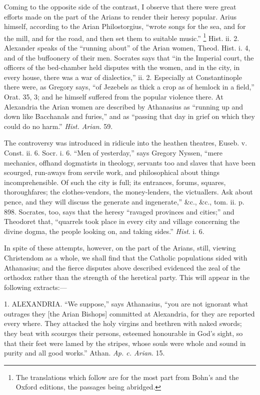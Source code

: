 Coming to the opposite side of the contrast, I observe that there
were great efforts made on the part of the Arians to render their
heresy popular. Arius himself, according to the Arian Philostorgius,
``wrote songs for the sea, and for the mill, and for the road, and
then set them to suitable music.'' \footnote{The translations which follow are for the
most part from Bohn's and the Oxford editions, the passages being
abridged.} Hist. ii. 2. Alexander speaks of the ``running about''
of the Arian women, Theod. Hist. i. 4, and of the buffoonery of their
men. Socrates says that ``in the Imperial court, the officers of
the bed-chamber held disputes with the women, and in the city,
in every house, there was a war of dialectics,'' ii. 2. Especially
at Constantinople there were, as Gregory says, ``of Jezebels as
thick a crop as of hemlock in a field,'' Orat. 35, 3; and he
himself suffered from the popular violence there. At Alexandria the
Arian women are described by Athanasius as ``running up and down
like Bacchanals and furies,'' and as ``passing that day in
grief on which they could do no harm.'' \emph{Hist. Arian}. 59.

The controversy was introduced in ridicule into the heathen
theatres, Euseb. v. Const. ii. 6. Socr. i. 6. ``Men of
yesterday,'' says Gregory Nyssen, ``mere mechanics, offhand
dogmatists in theology, servants too and slaves that have been
scourged, run-aways from servile work, and philosophical about things
incomprehensible. Of such the city is full; its entrances, forums,
squares, thoroughfares; the clothes-vendors, the money-lenders, the
victuallers. Ask about pence, and they will discuss the generate and
ingenerate,'' \&c., \&c., tom. ii. p. 898. Socrates, too,
says that the heresy ``ravaged provinces and cities;'' and
Theodoret that, ``quarrels took place in every city and village
concerning the divine dogma, the people looking on, and taking
sides.'' \emph{Hist}. i. 6.

In spite of these attempts, however, on the part of the Arians,
still, viewing Christendom as a whole, we shall find that the Catholic
populations sided with Athanasius; and the fierce disputes above
described evidenced the zeal of the orthodox rather than the strength
of the heretical party. This will appear in the following extracts:—

1. ALEXANDRIA. ``We suppose,'' says
Athanasius, ``you are not ignorant what outrages they [the Arian
Bishops] committed at Alexandria, for they are reported every where.
They attacked the holy virgins and brethren with naked swords; they
beat with scourges their persons, esteemed honourable in God's sight,
so that their feet were lamed by the stripes, whose souls were whole
and sound in purity and all good works.'' Athan. \emph{Ap. c. Arian}.
15.

